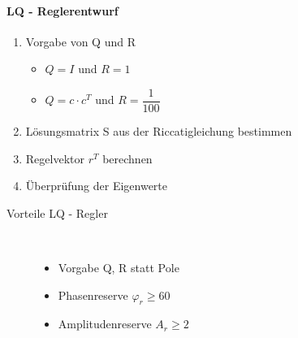 \paragraph{LQ - Reglerentwurf}
	\begin{enumerate}
		\item Vorgabe von Q und R
		\begin{itemize}
			\item $ Q=I $ und $ R=1 $
			\item $ Q=c\cdot c^T $ und $ R= \dfrac{1}{100} $
		\end{itemize}
		\item Lösungsmatrix S aus der Riccatigleichung bestimmen
		\item Regelvektor $ r^T $ berechnen
		\item Überprüfung der Eigenwerte
	\end{enumerate}

\begin{description}
	\item[Vorteile LQ - Regler]~\par
	\begin{itemize}
		\item Vorgabe Q, R statt Pole
		\item Phasenreserve $\varphi_r  \geqslant 60 $\textdegree 
		\item Amplitudenreserve $ A_r \geqslant 2 $		
	\end{itemize}
\end{description}
